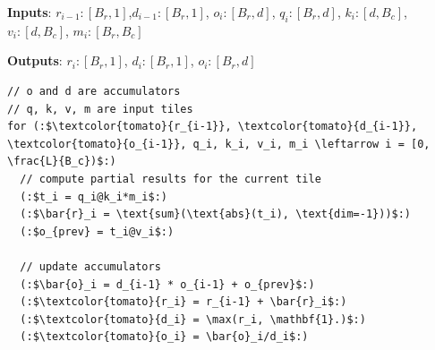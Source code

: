 \textbf{Inputs}: $r_{i-1}:[B_r, 1]$,$d_{i-1}:[B_r,1]$, $o_{i}:[B_r, d]$, $q_i: [B_r, d]$, $k_i: [d, B_c]$, $v_i : [d, B_c]$, $m_i : [B_r, B_c]$

\textbf{Outputs}: $r_i:[B_r, 1]$, $d_{i}:[B_r, 1]$, $o_{i}:[B_r,d]$

\begin{lstlisting}[language=code_example, caption={Fused multi-scale attention kernel.}]
// o and d are accumulators
// q, k, v, m are input tiles
for (:$\textcolor{tomato}{r_{i-1}}, \textcolor{tomato}{d_{i-1}}, \textcolor{tomato}{o_{i-1}}, q_i, k_i, v_i, m_i \leftarrow i = [0, \frac{L}{B_c})$:) 
  // compute partial results for the current tile
  (:$t_i = q_i@k_i*m_i$:)
  (:$\bar{r}_i = \text{sum}(\text{abs}(t_i), \text{dim=-1}))$:)
  (:$o_{prev} = t_i@v_i$:)
  
  // update accumulators 
  (:$\bar{o}_i = d_{i-1} * o_{i-1} + o_{prev}$:)
  (:$\textcolor{tomato}{r_i} = r_{i-1} + \bar{r}_i$:)
  (:$\textcolor{tomato}{d_i} = \max(r_i, \mathbf{1}.)$:)
  (:$\textcolor{tomato}{o_i} = \bar{o}_i/d_i$:)
\end{lstlisting}